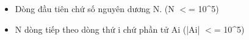 \begin{itemize}
	\item Dòng đầu tiên chứ số nguyên dương N. (N $<$= 10\textasciicircum5)
	\item N dòng tiếp theo dòng thứ i chứ phần tử Ai (|Ai| $<$= 10\textasciicircum5)
\end{itemize}